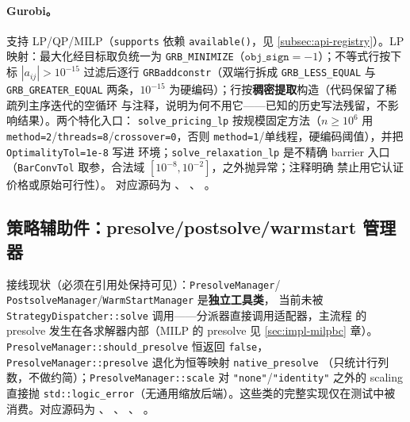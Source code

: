 \paragraph{Gurobi。}
支持 LP/QP/MILP（\texttt{supports} 依赖 \texttt{available()}，见
\ref{subsec:api-registry}）。LP 映射：最大化经目标取负统一为
\texttt{GRB\_MINIMIZE}（$\texttt{obj\_sign}=-1$）；不等式行按下标
$|a_{ij}|>10^{-15}$ 过滤后逐行 \texttt{GRBaddconstr}（双端行拆成
\texttt{GRB\_LESS\_EQUAL} 与 \texttt{GRB\_GREATER\_EQUAL} 两条，$10^{-15}$
为硬编码）；行按\textbf{稠密提取}构造（代码保留了稀疏列主序迭代的空循环
与注释，说明为何不用它——已知的历史写法残留，不影响结果）。两个特化入口：
\texttt{solve\_pricing\_lp} 按规模固定方法（$n\ge10^{6}$ 用
\texttt{method=2}/\texttt{threads=8}/\texttt{crossover=0}，否则
\texttt{method=1}/单线程，硬编码阈值），并把 \texttt{OptimalityTol=1e-8} 写进
环境；\texttt{solve\_relaxation\_lp} 是不精确 barrier 入口
（\texttt{BarConvTol} 取参，合法域 $[10^{-8},10^{-2}]$，之外抛异常；注释明确
禁止用它认证价格或原始可行性）。
对应源码为
、
、
。

\subsection{策略辅助件：presolve/postsolve/warmstart 管理器}\label{subsec:api-strategy-aux}

\begin{boundarynote}
接线现状（必须在引用处保持可见）：\texttt{PresolveManager}/%
\texttt{PostsolveManager}/\texttt{WarmStartManager} 是\textbf{独立工具类}，
当前未被 \texttt{StrategyDispatcher::solve} 调用——分派器直接调用适配器，主流程
的 presolve 发生在各求解器内部（MILP 的 presolve 见 \ref{sec:impl-milpbc} 章）。
\texttt{PresolveManager::should\_presolve} 恒返回 \texttt{false}，
\texttt{PresolveManager::presolve} 退化为恒等映射 \texttt{native\_presolve}
（只统计行列数，不做约简）；\texttt{PresolveManager::scale} 对
\texttt{"none"}/\texttt{"identity"} 之外的 scaling 直接抛
\texttt{std::logic\_error}（无通用缩放后端）。这些类的完整实现仅在测试中被
消费。对应源码为
、
、
、
。
\end{boundarynote}

